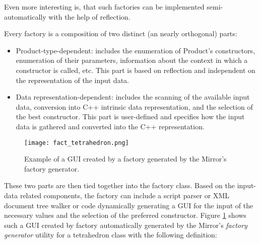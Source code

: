 Even more interesting is, that such factories can be
implemented semi-automatically with the help of reflection.

Every factory is a composition of two distinct (an nearly orthogonal)
parts:

\begin{itemize}
\item{Product-type-dependent}: includes the enumeration of Product's
constructors, enumeration of their parameters, information about
the context in which a constructor is called, etc. This part is based
on reflection and independent on the representation of the input data.

\item{Data representation-dependent}: includes the scanning of the
available input data, conversion into C++ intrinsic data representation,
and the selection of the best constructor. This part is user-defined
and specifies how the input data is gathered and converted into the
C++ representation.
\end{itemize}

\begin{figure}[!th]
\centering
\texttt{[image: fact\_tetrahedron.png]}
\caption{Example of a GUI created by a factory generated by
the Mirror's factory generator.}
\label{fig:fact-tetrahedron}
\end{figure}

These two parts are then tied together into the factory class. Based
on the input-data related components, the factory can include a script parser
or XML document tree walker or code dynamically generating a GUI
for the input of the necessary values and the selection of the preferred
constructor. Figure \ref{fig:fact-tetrahedron} shows such a GUI created
by factory automatically generated by the Mirror's {\em factory generator}
utility for a tetrahedron class with the following definition:

